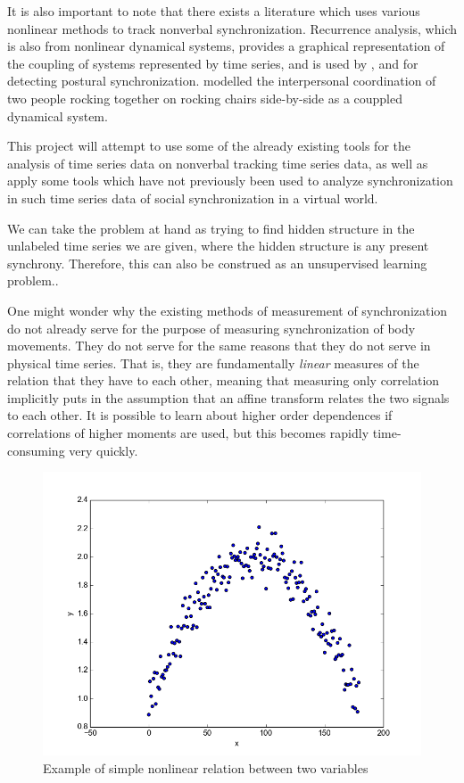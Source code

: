 \documentclass[12pt]{article}
\begin{document}
It is also important to note that there exists a literature which uses various nonlinear methods to track nonverbal synchronization. Recurrence analysis, which is also from nonlinear dynamical systems, provides a graphical representation of the coupling of systems represented by time series, and is used by \cite{webber}, \cite{musicians} and \cite{puzzles} for detecting postural synchronization. \cite{richardson} modelled the interpersonal coordination of two people rocking together on rocking chairs side-by-side as a couppled dynamical system.

This project will attempt to use some of the already existing tools for the analysis of time series data on nonverbal tracking time series data, as well as apply some tools which have not previously been used to analyze synchronization in such time series data of social synchronization in a virtual world.

We can take the problem at hand as trying to find hidden structure in the unlabeled time series we are given, where the hidden structure is any present synchrony. Therefore, this can also be construed as an unsupervised learning problem.\cite{socialsync}.

One might wonder why the existing methods of measurement of synchronization do not already serve for the purpose of measuring synchronization of body movements. They do not serve for the same reasons that they do not serve in physical time series. That is, they are fundamentally \emph{linear} measures of the relation that they have to each other, meaning that measuring only correlation implicitly puts in the assumption that an affine transform relates the two signals to each other. It is possible to learn about higher order dependences if correlations of higher moments are used, but this becomes rapidly time-consuming very quickly\cite{pompe}.

\begin{figure}\label{fig:nonlinearity}
  \begin{center}
    \includegraphics[scale=0.5]{mi_ex}
  \end{center}
  \caption{Example of simple nonlinear relation between two variables}
\end{figure}
\end{document}
